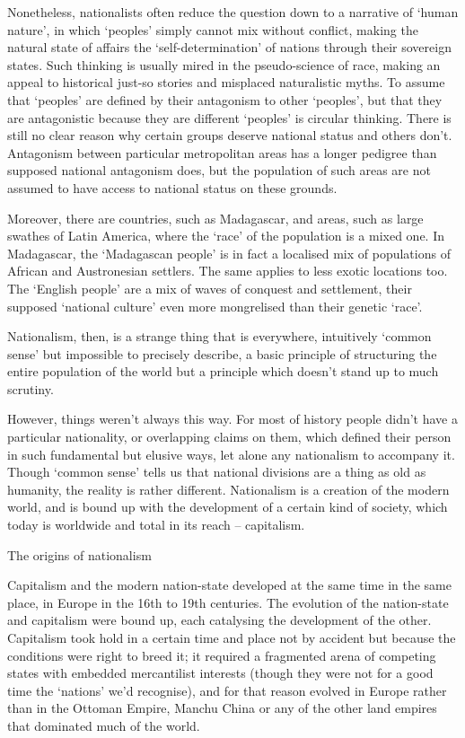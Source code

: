 Nonetheless, nationalists often reduce the question down to a narrative of ‘human nature’, in which ‘peoples’ simply cannot mix without conflict, making the natural state of affairs the ‘self-determination’ of nations through their sovereign states. Such thinking is usually mired in the pseudo-science of race, making an appeal to historical just-so stories and misplaced naturalistic myths. To assume that ‘peoples’ are defined by their antagonism to other ‘peoples’, but that they are antagonistic because they are different ‘peoples’ is circular thinking. There is still no clear reason why certain groups deserve national status and others don’t. Antagonism between particular metropolitan areas has a longer pedigree than supposed national antagonism does, but the population of such areas are not assumed to have access to national status on these grounds.

Moreover, there are countries, such as Madagascar, and areas, such as large swathes of Latin America, where the ‘race’ of the population is a mixed one. In Madagascar, the ‘Madagascan people’ is in fact a localised mix of populations of African and Austronesian settlers. The same applies to less exotic locations too. The ‘English people’ are a mix of waves of conquest and settlement, their supposed ‘national culture’ even more mongrelised than their genetic ‘race’.

Nationalism, then, is a strange thing that is everywhere, intuitively ‘common sense’ but impossible to precisely describe, a basic principle of structuring the entire population of the world but a principle which doesn’t stand up to much scrutiny.

However, things weren’t always this way. For most of history people didn’t have a particular nationality, or overlapping claims on them, which defined their person in such fundamental but elusive ways, let alone any nationalism to accompany it. Though ‘common sense’ tells us that national divisions are a thing as old as humanity, the reality is rather different. Nationalism is a creation of the modern world, and is bound up with the development of a certain kind of society, which today is worldwide and total in its reach – capitalism.

The origins of nationalism

Capitalism and the modern nation-state developed at the same time in the same place, in Europe in the 16th to 19th centuries. The evolution of the nation-state and capitalism were bound up, each catalysing the development of the other. Capitalism took hold in a certain time and place not by accident but because the conditions were right to breed it; it required a fragmented arena of competing states with embedded mercantilist interests (though they were not for a good time the ‘nations’ we’d recognise), and for that reason evolved in Europe rather than in the Ottoman Empire, Manchu China or any of the other land empires that dominated much of the world.

